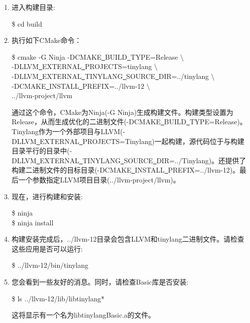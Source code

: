 \begin{enumerate}
\item 进入构建目录:
\begin{tcolorbox}[colback=white,colframe=black]
\$ cd build
\end{tcolorbox}

\item 执行如下CMake命令：
\begin{tcolorbox}[colback=white,colframe=black]
\$ cmake -G Ninja -DCMAKE\underline{~}BUILD\underline{~}TYPE=Release $\setminus$ \\
\hspace*{1cm}-DLLVM\underline{~}EXTERNAL\underline{~}PROJECTS=tinylang $\setminus$ \\
\hspace*{1cm}-DLLVM\underline{~}EXTERNAL\underline{~}TINYLANG\underline{~}SOURCE\underline{~}DIR=../tinylang $\setminus$ \\
\hspace*{1cm}-DCMAKE\underline{~}INSTALL\underline{~}PREFIX=../llvm-12 $\setminus$ \\
\hspace*{1cm}../llvm-project/llvm
\end{tcolorbox}
通过这个命令，CMake为Ninja(-G Ninja)生成构建文件。构建类型设置为Release，从而生成优化的二进制文件(-DCMAKE\underline{~}BUILD\underline{~}TYPE=Release)。Tinylang作为一个外部项目与LLVM(-DLLVM\underline{~}EXTERNAL\underline{~}PROJECTS=Tinylang)一起构建，源代码位于与构建目录平行的目录中(-DLLVM\underline{~}EXTERNAL\underline{~}TINYLANG\underline{~}SOURCE\underline{~}DIR=../Tinylang)。还提供了构建二进制文件的目标目录(-DCMAKE\underline{~}INSTALL\underline{~}PREFIX=../llvm-12)。最后一个参数指定LLVM项目目录(../llvm-project/llvm)。
	
\item 现在，进行构建和安装:
\begin{tcolorbox}[colback=white,colframe=black]
\$ ninja \\
\$ ninja install
\end{tcolorbox}

\item 构建安装完成后，../llvm-12目录会包含LLVM和tinylang二进制文件。请检查这些应用是否可以运行:
\begin{tcolorbox}[colback=white,colframe=black]
\$ ../llvm-12/bin/tinylang
\end{tcolorbox}

\item 您会看到一些友好的消息。同时，请检查Basic库是否安装:
\begin{tcolorbox}[colback=white,colframe=black]
\$ ls ../llvm-12/lib/libtinylang*
\end{tcolorbox}
这将显示有一个名为libtinylangBasic.a的文件。

\end{enumerate}

